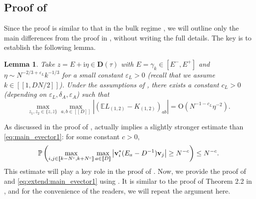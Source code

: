 \documentclass[10pt,reqno]{amsart}
\numberwithin{equation}{section}
\numberwithin{figure}{section}
\theoremstyle{plain} %
\newtheorem{lemma}[theorem]{Lemma}
\theoremstyle{definition} %
\newcommand{\wt}{\widetilde}
\newcommand{\E}{\mathbb{E}}
\newcommand{\ii}{\mathrm{i}}
\renewcommand{\bar}{\overline}
\newcommand{\qq}[1]{[\![{#1}]\!]}
\newcommand{\pa}[1]{\left({#1}\right)}
\newcommand{\qa}[1]{\left[{#1}\right]}
\newcommand{\be}{\begin{equation}}
\newcommand{\ee}{\end{equation}}
\newcommand{\OO}{\mathrm{O}}
\numberwithin{equation}{section}
\begin{document}
\subsection{Proof of }
Since the proof is similar to that in the bulk regime  \cite{stone2024randommatrixmodelquantum}, we will outline only the main differences from the proof in \cite{stone2024randommatrixmodelquantum}, without writing the full details. The key is to establish the following lemma. 

\begin{lemma}\label{key_lemma_delocalized_eigenvector}
Take $z=E+\ii \eta\in \mathbf D\pa{\tau}$ with $E=\gamma_k\in \qa{E^{-},E^+}$ and $\eta\sim N^{-2/3+\varepsilon_L}k^{-1/3}$ for a small constant $\varepsilon_L>0$ (recall that we assume $k\in\qq{1,DN/2}$). Under the assumptions of , there exists a constant $c_L>0$ (depending on $\varepsilon_L,\delta_A,\varepsilon_A$) such that 
\be\label{main_EGG}
\max_{z_1,z_2\in\{z,\overline z\}}\max_{a,b\in \qq{D}}\left|\left(\E L_{(1,2)}- K_{(1,2)}\right)_{ab}\right|%
=\OO\pa{N^{-1-c_L}\eta^{-2}} .
\ee
\end{lemma}

As discussed in the proof of \cite[Theorem 2.2]{stone2024randommatrixmodelquantum},  actually implies a slightly stronger estimate than \eqref{eq:main_evector1}: for some constant $c>0$,
\begin{equation}\label{eq:extend:main_evector1}
\mathbb P\left(\max _{i,j\in \qq{k-N^c,k+N^c}}\max_{a\in \qq D}
\left| {\bf v}_i^* (E_a-D^{-1}){\bf v}_j \right|\ge N^{-c}\right) \le  N^{-c}.
\end{equation}
This estimate will play a key role in the proof of . 
Now, we provide the proof of  and \eqref{eq:extend:main_evector1} using . It is similar to the proof of Theorem 2.2 in \cite{stone2024randommatrixmodelquantum}, and for the convenience of the readers, we will repeat the argument here.
\end{document}
